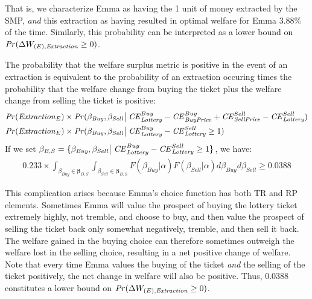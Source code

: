 That is, we characterize Emma as having the 1 unit of money extracted by the SMP, \textit{and} this extraction as having resulted in optimal welfare for Emma $3.88\%$ of the time.
Similarly, this probability can be interpreted as a lower bound on ${\mathit{Pr}}(\Delta W_{(E),\mathit{Extraction}} \geq 0)$.

The probability that the welfare surplus metric is positive in the event of an extraction is equivalent to the probability of an extraction occuring times the probability that the welfare change from buying the ticket plus the welfare change from selling the ticket is positive:
\begin{align*}
{\ensuremath{\mathit{Pr}}}(\mathit{Extraction}_E) &\times {\ensuremath{\mathit{Pr}}}(\beta_{\mathit{Buy}},\beta_{\mathit{Sell}} \big| \; {\mathit{CE}}_{\mathit{Lottery}}^{Buy} - {\mathit{CE}}_{\mathit{Buy Price}}^{Buy} + {\mathit{CE}}_{\mathit{Sell Price}}^{Sell} - {\mathit{CE}}_{\mathit{Lottery}}^{Sell} )\\
{\mathit{Pr}}(\mathit{Extraction}_E) &\times {\ensuremath{\mathit{Pr}}}(\beta_{\mathit{Buy}},\beta_{\mathit{Sell}} \big| \; {\mathit{CE}}_{\mathit{Lottery}}^{Buy} - {\mathit{CE}}_{\mathit{Lottery}}^{Sell} \geq 1 )
\end{align*}
If we set $\mathbf{\beta_{\mathit{B,S}}} = \{ \beta_{\mathit{Buy}},\beta_{\mathit{Sell}} \big| \; {\mathit{CE}}_{\mathit{Lottery}}^{Buy} - {\mathit{CE}}_{\mathit{Lottery}}^{Sell} \geq 1\}$,{\footnotemark} we have:
\begin{align}
	0.233 \times \int_{\beta_{\mathit{Buy}} \in \mathbf{\beta_{\mathit{B,S}}}} \int_{\beta_{\mathit{Sell}} \in \mathbf{\beta_{\mathit{B,S}}}} F(\beta_{\mathit{Buy}} | \alpha) F(\beta_{\mathit{Sell}}|\alpha) d\beta_{\mathit{Buy}} d\beta_{\mathit{Sell}} \geq 0.0388
\end{align}

This complication arises because Emma's choice function has both TR and RP elements.
Sometimes Emma will value the prospect of buying the lottery ticket extremely highly, not tremble, and choose to buy, and then value the prospect of selling the ticket back only somewhat negatively, tremble, and then sell it back.
The welfare gained in the buying choice can therefore sometimes outweigh the welfare lost in the selling choice, resulting in a net positive change of welfare.
Note that every time Emma values the buying of the ticket \textit{and} the selling of the ticket positively, the net change in welfare will also be positive.
Thus, $0.0388$ constitutes a lower bound on ${\mathit{Pr}}(\Delta W_{(E),\mathit{Extraction}} \geq 0)$.

\addtocounter{footnote}{-1}


